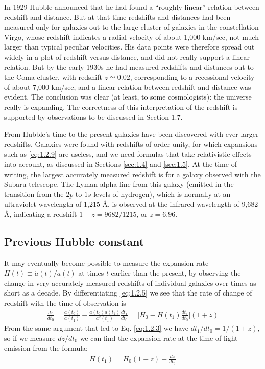 \documentclass[11pt]{ltjsarticle}
\theoremstyle{plain}
\theoremstyle{break}
\begin{document}
In 1929 Hubble announced that he had found a “roughly linear” relation between redshift and distance.
But at that time redshifts and distances had been measured only for galaxies out to the large cluster of galaxies in the constellation Virgo, whose redshift indicates a radial velocity of about 1,000 km/sec, not much larger than typical peculiar velocities.
His data points were therefore spread out widely in a plot of redshift versus distance, and did not really support a linear relation.
But by the early 1930s he had measured redshifts and distances out to the Coma cluster, with redshift $z \simeq 0.02$, corresponding to a recessional velocity of about 7,000 km/sec, and a linear relation between redshift and distance was evident.
The conclusion was clear (at least, to some cosmologists): the universe really is expanding.
The correctness of this interpretation of the redshift is supported by observations to be discussed in Section 1.7.

From Hubble’s time to the present galaxies have been discovered with ever larger redshifts. Galaxies were found with redshifts of order unity, for which expansions such as \ref{eq:1.2.9} are useless, and we need formulas that take relativistic effects into account, as discussed in Sections \ref{sec:1.4} and \ref{sec:1.5}. At the time of writing, the largest accurately measured redshift is for a galaxy observed with the Subaru telescope.
The Lyman alpha line from this galaxy (emitted in the transition from the $2p$ to $1s$ levels of hydrogen), which is normally at an ultraviolet wavelength of 1,215 \AA, is observed at the infrared wavelength of 9,682 \AA, indicating a redshift $1 + z = 9682/1215$, or $z = 6.96$.

\subsection{Previous Hubble constant}
It may eventually become possible to measure the expansion rate $H (t) \equiv \dot{a}(t)/a(t)$ at times $t$ earlier than the present, by observing the change in very accurately measured redshifts of individual galaxies over times as short as a decade.
By differentiating \eqref{eq:1.2.5} we see that the rate of change of redshift with the time of observation is
\begin{align}
  \frac{dz}{dt_0} = \frac{\dot{a}(t_0)}{a(t_1)} - \frac{a(t_0) \dot{a}(t_1)}{a^2(t_1)} \frac{dt_1}{dt_0} = \Big[H_0 - H(t_1) \frac{dt_1}{dt_0}\Big] (1+z)
\end{align}
From the same argument that led to Eq. \eqref{eq:1.2.3} we have $dt_1/dt_0 = 1/(1+z)$, so if we measure $dz/dt_0$ we can find the expansion rate at the time of light emission from the formula:
\begin{align}
  H(t_1) = H_0(1+z) - \frac{dz}{dt_0} \label{eq:1.2.10}
\end{align}
\end{document}
